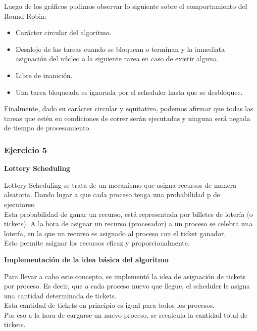 \indent Luego de los gráficos pudimos observar lo siguiente sobre el comportamiento del Round-Robin:\\
\begin{itemize}
\item  Carácter circular del algoritmo.
\item  Desalojo de las tareas cuando se bloquean o terminan y la inmediata asignación del núcleo a la siguiente tarea en caso de existir alguna.
\item  Libre de inanición.
\item  Una tarea bloqueada es ignorada por el scheduler hasta que se desbloquee.
\end{itemize}

\indent Finalmente, dado su carácter circular y equitativo, podemos afirmar que todas las tareas que 
estén en condiciones de correr serán ejecutadas y ninguna será negada de tiempo de procesamiento.\\

\subsubsection[Resolución Ejercicio 5]{Ejercicio 5}

\begin{center}
\textbf{Lottery Scheduling} 
\end{center}

\indent Lottery Scheduling se trata de un mecanismo que asigna recursos de manera aleatoria. Dando lugar a que cada proceso
tenga una probabilidad p de ejecutarse. \\
Esta probabilidad de ganar un recurso, está representada por billetes de lotería (o tickets). A la hora de asignar un recurso
(procesador) a un proceso se celebra una lotería, en la que un recurso es asignado al proceso con el ticket ganador.\\
Esto permite asignar los recursos eficaz y proporcionalmente.

\begin{center}
\textbf{Implementación de la idea básica del algoritmo} 
\end{center}

\indent Para llevar a cabo este concepto, se implementó la idea de asignación de tickets por proceso. 
Es decir, que a cada proceso nuevo que llegue, el scheduler le asigna una cantidad determinada de tickets. \\
Esta cantidad de tickets en principio es igual para todos los procesos.\\
Por eso a la hora de cargarse un nuevo proceso, se recalcula la cantidad total de tickets.\\


